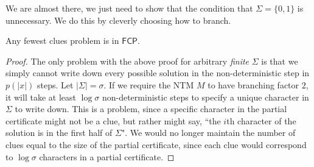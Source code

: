 \documentclass[runningheads,a4paper]{llncs}
\begin{document}
We are almost there, we just need to show that the condition that $\Sigma = \{ 0, 1\}$ is unnecessary. We do this by cleverly choosing how to branch.

\begin{proposition}
Any fewest clues problem is in $\mathsf{FCP}$.
\end{proposition}

\begin{proof}
The only problem with the above proof for arbitrary \emph{finite} $\Sigma$ is that we simply cannot write down every possible solution in the non-deterministic step in $p(|x|)$ steps. Let $|\Sigma| = \sigma$. If we require the NTM $M$ to have branching factor $2$, it will take at least $\log \sigma$ non-deterministic steps to specify a unique character in $\Sigma$ to write down. This is a problem, since a specific character in the partial certificate might not be a clue, but rather might say, ``the $i$th character of the solution is in the first half of $\Sigma$". We would no longer maintain the number of clues equal to the size of the partial certificate, since each clue would correspond to $\log \sigma$ characters in a partial certificate.


\end{proof}
\end{document}
